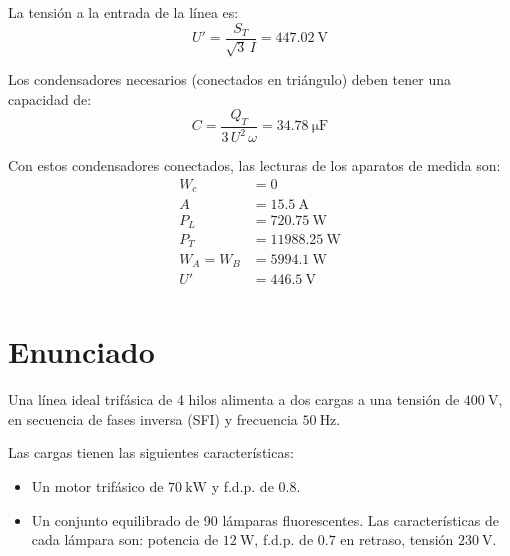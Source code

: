 La tensión a la entrada de la línea es:
\begin{equation*}
  U' = \frac{S_T}{\sqrt{3} \,I} = \SI{447.02}{\volt}
\end{equation*}

Los condensadores necesarios (conectados en triángulo) deben tener una
capacidad de:
\begin{equation*}
  C = \frac{Q_T}{3 \,U^2 \,\omega} = \SI{34.78}{\micro\farad}
\end{equation*}

Con estos condensadores conectados, las lecturas de los aparatos de
medida son:
\begin{align*}
  W_c &= 0\\
  A &= \SI{15.5}{\ampere}\\
  P_L &= \SI{720.75}{\watt}\\
  P_T &= \SI{11988.25}{\watt}\\
  W_A = W_B &= \SI{5994.1}{\watt}\\
  U' &= \SI{446.5}{\volt}\\  
\end{align*}



\section{Enunciado}

Una línea ideal trifásica de 4 hilos alimenta a dos cargas a una
tensión de $\SI{400}{\volt}$, en secuencia de fases inversa (SFI) y
frecuencia $\SI{50}{\hertz}$.

\vspace{3mm}
Las cargas tienen las siguientes características:
\begin{itemize}
\item Un motor trifásico de $\SI{70}{\kilo\watt}$ y f.d.p. de $0.8$.
\item Un conjunto equilibrado de 90 lámparas fluorescentes. Las
  características de cada lámpara son: potencia de $\SI{12}{\watt}$,
  f.d.p. de $0.7$ en retraso, tensión $\SI{230}{\volt}$.
\end{itemize}

